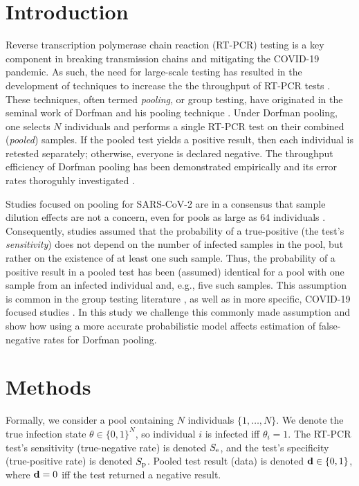 \documentclass{article}
\begin{document}
\section*{Introduction}
Reverse transcription polymerase chain reaction (RT-PCR) testing is a
key component in breaking transmission chains and mitigating the
COVID-19 pandemic. As such, the need for large-scale testing has
resulted in the development of techniques to increase the the
throughput of RT-PCR tests \cite{DorfmanYuvalDor, PoolSize30,
  BayesianDorfman, MatrixPooling, LionDorfman}. These techniques,
often termed \emph{pooling}, or group testing, have originated in the
seminal work of Dorfman and his pooling technique
\cite{DorfmanOriginal, DorfmanYuvalDor}. Under Dorfman pooling, one
selects $N$ individuals and performs a single RT-PCR test on their
combined (\emph{pooled}) samples. If the pooled test yields a positive
result, then each individual is retested separately; otherwise,
everyone is declared negative. The throughput efficiency of Dorfman
pooling has been demonstrated empirically \cite{DorfmanYuvalDor} and
its error rates thoroguhly investigated \cite{Kim, Simplistic1,
  OptimalDorfmanPool}.

Studies focused on pooling for SARS-CoV-2 are in a consensus that
sample dilution effects \cite{DilutionHIV, GroupDilution} are not a
concern, even for pools as large as 64 individuals \cite{PoolSize30,
  Lion, DorfmanYuvalDor, DilutionCOVID}. Consequently, studies assumed
that the probability of a true-positive (the test's
\emph{sensitivity}) does not depend on the number of infected samples
in the pool, but rather on the existence of at least one such
sample. Thus, the probability of a positive result in a pooled test
has been (assumed) identical for a pool with one sample from an
infected individual and, e.g., five such samples. This assumption is
common in the group testing literature \cite{Kim, OptimalDorfmanPool},
as well as in more specific, COVID-19 focused studies
\cite{Simplistic1, Simplistic2}. In this study we challenge this
commonly made assumption and show how using a more accurate
probabilistic model affects estimation of false-negative rates for
Dorfman pooling.

\section*{Methods}
Formally, we consider a pool containing $N$ individuals
$\{1,\dots,N\}$. We denote the true infection state $\theta \in
\{0,1\}^N$, so individual $i$ is infected iff $\theta_i=1$. The RT-PCR
test's sensitivity (true-negative rate) is denoted $S_{\text{e}}$, and the
test's specificity (true-positive rate) is denoted $S_{\text{p}}$. Pooled
test result (data) is denoted $\mathbf{d} \in \{0,1\}$, where $\mathbf{d}=0$ iff
the test returned a negative result.
\end{document}
